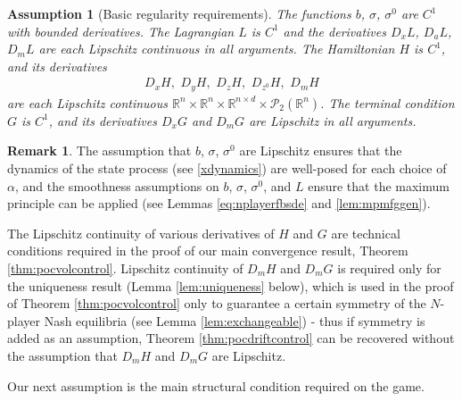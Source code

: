 \documentclass[11pt,reqno]{amsart}
\numberwithin{equation}{section}
\newtheorem{assumption}[theorem]{Assumption}
\theoremstyle{definition}
\newtheorem{remark}[theorem]{Remark}
\def\R{{\mathbb R}}
\newcommand{\spt}{\mathcal{P}_2(\R^n)}
\def \R{\mathbb{R}}
\begin{document}
\begin{assumption}[Basic regularity requirements] \label{assump:controlledvolreg}
The functions $b$, $\sigma$, $\sigma^0$ are $C^1$ with bounded derivatives. The Lagrangian $L$ is $C^1$ and the derivatives $D_x L$, $D_a L$, $D_m L$ are each Lipschitz continuous in all arguments.
The Hamiltonian $H$ is $C^1$, and its derivatives
\begin{align*}
    D_x H, \,\, D_y H, \,\, D_z H, \,\, D_{z^0} H, \,\, D_m H
\end{align*}
are each Lipschitz continuous 
 $\R^n \times \R^n \times \R^{n \times d} \times \spt$.  
The terminal condition $G$ is $C^1$, and its derivatives $D_x G$ and $D_mG$ are Lipschitz in all arguments.
\end{assumption}

\begin{remark}
The assumption that $b$, $\sigma$, $\sigma^0$ are Lipschitz ensures that the dynamics of the state process (see \eqref{xdynamics}) are well-posed for each choice of $\alpha$, and the smoothness assumptions on $b$, $\sigma$, $\sigma^0$, and $L$ ensure that the maximum principle can be applied (see Lemmas \ref{eq:nplayerfbsde} and \ref{lem:mpmfggen}). 


The Lipschitz continuity of various derivatives of $H$ and $G$ are technical conditions required in the proof of our main convergence result, Theorem \ref{thm:pocvolcontrol}. Lipschitz continuity of $D_m H$ and $D_m G$ is required only for the uniqueness result (Lemma \ref{lem:uniqueness} below), which is used in the proof of Theorem \ref{thm:pocvolcontrol} only to guarantee a certain symmetry of the $N$-player Nash equilibria (see Lemma \ref{lem:exchangeable}) - thus if symmetry is added as an assumption, Theorem \ref{thm:pocdriftcontrol} can be recovered without the assumption that $D_m H$ and $D_m G$ are Lipschitz.
\end{remark}





Our next assumption is the main structural condition required on the game.
\end{document}
